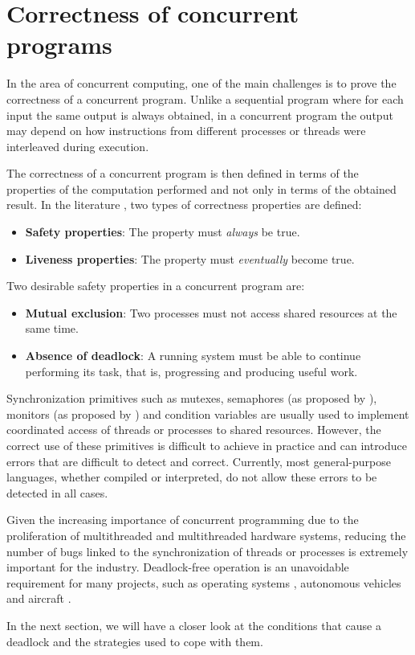 \documentclass[../Thesis.tex]{subfiles}
\begin{document}
\section{Correctness of concurrent programs}

In the area of concurrent computing, one of the main challenges is
to prove the correctness of a concurrent program.
Unlike a sequential program where for each input the same output
is always obtained, in a concurrent program the output may depend
on how instructions from different processes or
threads were interleaved during execution.

The correctness of a concurrent program is then defined
in terms of the properties of the computation performed
and not only in terms of the obtained result.
In the literature \cite{ben-ari2006,coulouris2012,tanenbaum2017},
two types of correctness properties are defined:

\begin{itemize}
  \item \textbf{Safety properties}: The property must \emph{always} be true.
  \item \textbf{Liveness properties}: The property must \emph{eventually} become true.

\end{itemize}

Two desirable safety properties in a concurrent program are:

\begin{itemize}
  \item \textbf{Mutual exclusion}: Two processes must not access shared resources at the same time.
  \item \textbf{Absence of deadlock}: A running system must be able to continue performing its task,
        that is, progressing and producing useful work.
\end{itemize}

Synchronization primitives such as mutexes,
semaphores (as proposed by \cite{Dijkstra2002}),
monitors (as proposed by \cite{hoare1974monitors})
and condition variables are usually used
to implement coordinated access of threads or processes to shared resources.
However, the correct use of these primitives is difficult to achieve in practice
and can introduce errors that are difficult to detect and correct.
Currently, most general-purpose languages, whether compiled or interpreted,
do not allow these errors to be detected in all cases.

Given the increasing importance of concurrent programming due to the proliferation
of multithreaded and multithreaded hardware systems,
reducing the number of bugs linked to the synchronization of threads or processes
is extremely important for the industry.
Deadlock-free operation is an unavoidable requirement for many projects, such as
operating systems \cite{ArpaciDusseau2018}, autonomous vehicles \cite{Perronnet2019}
and aircraft \cite{carreno2005safety,monzon2009deadlock}.

In the next section, we will have a closer look at the conditions that cause a deadlock
and the strategies used to cope with them.
\end{document}

